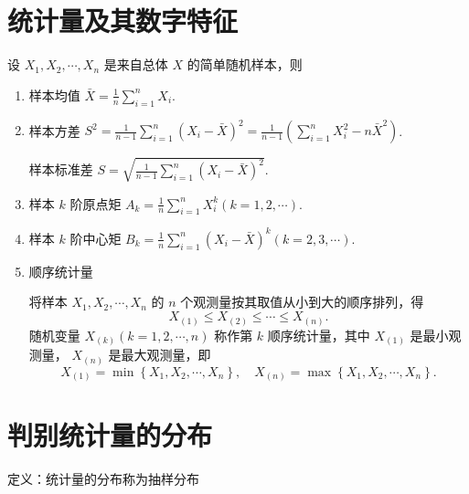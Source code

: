 \section{统计量及其数字特征}
设 $X_{1}, X_{2}, \cdots, X_{n}$ 是来自总体 $X$ 的简单随机样本，则
\begin{enumerate}
      \item 样本均值 $\bar{X}=\frac{1}{n} \sum_{i=1}^{n} X_{i}$.
      \item 样本方差 $S^{2}=\frac{1}{n-1} \sum_{i=1}^{n}\left(X_{i}-\bar{X}\right)^{2}=\frac{1}{n-1}\left(\sum_{i=1}^{n} X_{i}^{2}-n \bar{X}^{2}\right)$.

            样本标准差 $S=\sqrt{\frac{1}{n-1} \sum_{i=1}^{n}\left(X_{i}-\bar{X}\right)^{2}}$.
      \item 样本 $k$ 阶原点矩 $A_{k}=\frac{1}{n} \sum_{i=1}^{n} X_{i}^{k}(k=1,2, \cdots)$.
      \item 样本 $k$ 阶中心矩 $B_{k}=\frac{1}{n} \sum_{i=1}^{n}\left(X_{i}-\bar{X}\right)^{k}(k=2,3, \cdots)$.
      \item 顺序统计量

            将样本 $X_{1}, X_{2}, \cdots, X_{n}$ 的 $n$ 个观测量按其取值从小到大的顺序排列，得
            $$X_{(1)} \leqslant X_{(2)} \leqslant \cdots \leqslant X_{(n)}.$$
            随机变量 $X_{(k)}(k=1,2, \cdots, n)$ 称作第 $k$ 顺序统计量，其中 $X_{(1)}$ 是最小观测量， $X_{(n)}$ 是最大观测量，即
            $$X_{(1)}=\min \left\{X_{1}, X_{2}, \cdots, X_{n}\right\}, \quad X_{(n)}=\max \left\{X_{1}, X_{2}, \cdots, X_{n}\right\}.$$
\end{enumerate}

\section{判别统计量的分布}
定义：统计量的分布称为抽样分布


